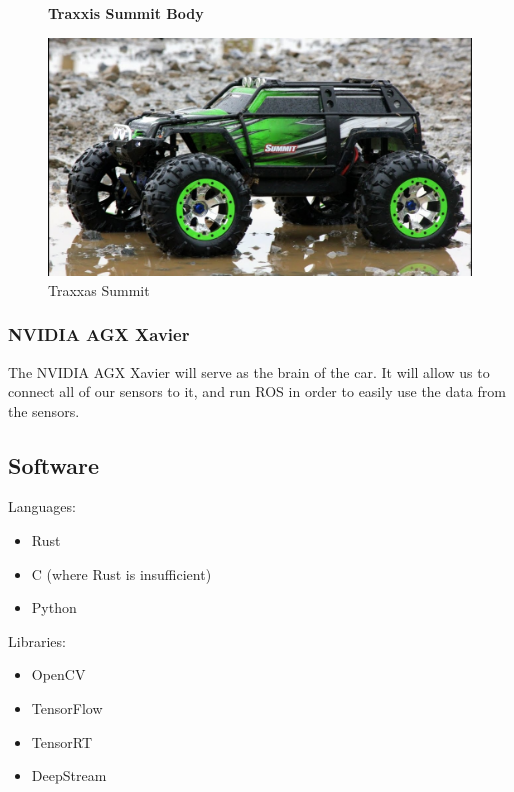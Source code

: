 \documentclass[onecolumn, draftclsnofoot,10pt]{IEEEtran}
\begin{document}
\begin{figure}[h!]
  \centering
  \textbf{Traxxis Summit Body}\par\medskip
    \includegraphics[width=\linewidth]{Summit.jpg}
    \caption{Traxxas Summit}
\end{figure}
 

    


\subsubsection{NVIDIA AGX Xavier}
    The NVIDIA AGX Xavier will serve as the brain of the car. It will allow us to connect all of our sensors to it, and run ROS in order to easily use the data from the sensors. 
\bigskip

\subsection{Software}

    Languages:
    
    \begin{itemize}
    \item Rust
    \item C (where Rust is insufficient)
    \item Python
    \end{itemize}
    
  \noindent Libraries:
    
    \begin{itemize}
    \item OpenCV
    \item TensorFlow
    \item TensorRT
    \item DeepStream
    \end{itemize}
    
\end{document}
